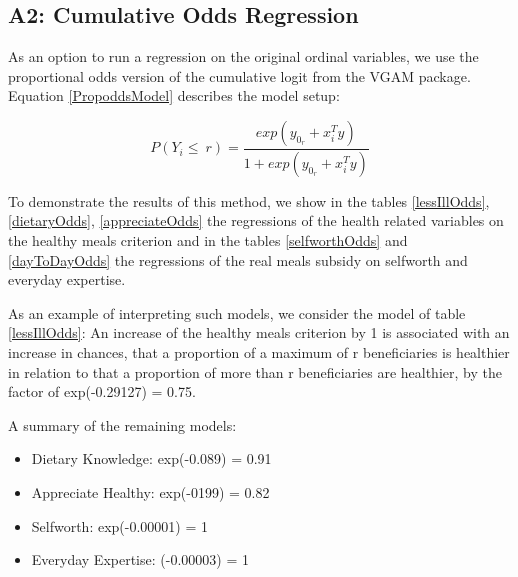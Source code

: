 \documentclass[12pt, a4paper, titlepage]{article}\usepackage[]{graphicx}\usepackage[]{color}
\begin{document}
\subsection{A2: Cumulative Odds Regression} 

As an option to run a regression on the original ordinal variables, we use the proportional odds version of the cumulative logit from the VGAM package. Equation \ref{PropoddsModel} describes the model setup: 

 
\begin{equation}
\label{PropoddsModel}
  P(Y_i \leq \ r) = \frac{exp(y_0_r + x_i^Ty)}{1+exp(y_0_r + x_i^Ty)}    
\end{equation}


To demonstrate the results of this method, we show in the tables \ref{lessIllOdds}, \ref{dietaryOdds}, \ref{appreciateOdds} the regressions of the health related variables on the healthy meals criterion and in the tables \ref{selfworthOdds} and \ref{dayToDayOdds} the regressions of the real meals subsidy on selfworth and everyday expertise. 

As an example of interpreting such models, we consider the model of table \ref{lessIllOdds}: An increase of the healthy meals criterion by 1 is associated with an increase in chances, that a proportion of a maximum of r beneficiaries is healthier in relation to that a proportion of more than r beneficiaries are healthier, by the factor of exp(-0.29127) = 0.75.

A summary of the remaining models:

\begin{itemize}
  \item{Dietary Knowledge: exp(-0.089) = 0.91}
  \item{Appreciate Healthy: exp(-0199) = 0.82}
  \item{Selfworth: exp(-0.00001) = 1}
  \item{Everyday Expertise: (-0.00003) = 1} 
\end{itemize}
\end{document}
